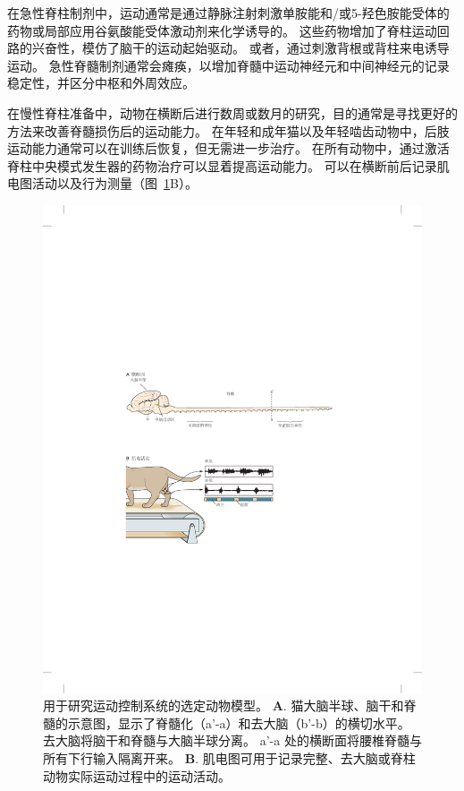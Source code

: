 \begin{proposition}[用于研究运动神经元控制的制剂]
	\quad \quad 在急性脊柱制剂中，运动通常是通过静脉注射刺激单胺能和/或5-羟色胺能受体的药物或局部应用谷氨酸能受体激动剂来化学诱导的。
	这些药物增加了脊柱运动回路的兴奋性，模仿了脑干的运动起始驱动。
	或者，通过刺激背根或背柱来电诱导运动。
	急性脊髓制剂通常会瘫痪，以增加脊髓中运动神经元和中间神经元的记录稳定性，并区分中枢和外周效应。
	
	\quad \quad 在慢性脊柱准备中，动物在横断后进行数周或数月的研究，目的通常是寻找更好的方法来改善脊髓损伤后的运动能力。
	在年轻和成年猫以及年轻啮齿动物中，后肢运动能力通常可以在训练后恢复，但无需进一步治疗。
	在所有动物中，通过激活脊柱中央模式发生器的药物治疗可以显着提高运动能力。
	可以在横断前后记录肌电图活动以及行为测量（图~\ref{fig:33_2}B）。
	
\end{proposition}


\begin{figure}[htbp]
	\centering
	\includegraphics[width=0.85\linewidth]{chap33/fig_33_2}
	\caption{用于研究运动控制系统的选定动物模型。
	\textbf{A}. 猫大脑半球、脑干和脊髓的示意图，显示了脊髓化（a'-a）和去大脑（b'-b）的横切水平。
	去大脑将脑干和脊髓与大脑半球分离。
	a'-a 处的横断面将腰椎脊髓与所有下行输入隔离开来。
	\textbf{B}. 肌电图可用于记录完整、去大脑或脊柱动物实际运动过程中的运动活动。}
	\label{fig:33_2}
\end{figure}


